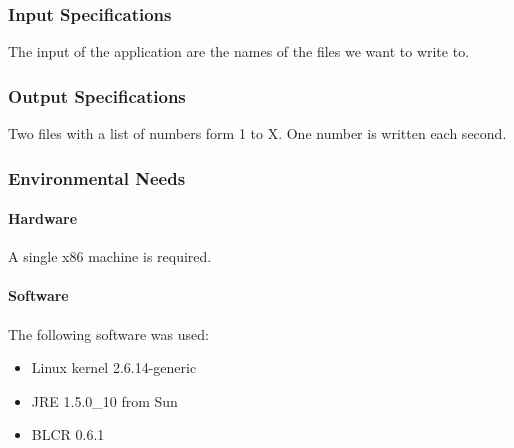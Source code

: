 \subsubsection{Input Specifications}

The input of the application are the names of the files we want to write to.

\subsubsection{Output Specifications}

Two files with a list of numbers form 1 to X. One number is written each second.

\subsubsection{Environmental Needs}

\paragraph{Hardware}

A single x86 machine is required.

\paragraph{Software}

The following software was used:
\begin{itemize}
\item Linux kernel 2.6.14-generic
\item JRE 1.5.0\_10 from Sun
\item BLCR 0.6.1
\end{itemize}

